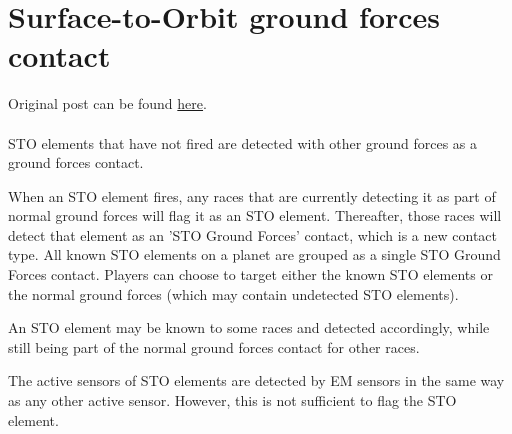 \documentclass[../../Aurora C# unofficial manual.tex]{subfiles}
\begin{document}
	\section{Surface-to-Orbit ground forces contact}
	Original post can be found
	\href{http://aurora2.pentarch.org/index.php?topic=8495.msg110505#msg110505}{here}.
	\\\\
	
	STO elements that have not fired are detected with other ground forces as a ground forces contact.
	
	When an STO element fires, any races that are currently detecting it as part of normal ground forces will flag it as an STO element. Thereafter, those races will detect that element as an 'STO Ground Forces' contact, which is a new contact type. All known STO elements on a planet are grouped as a single STO Ground Forces contact. Players can choose to target either the known STO elements or the normal ground forces (which may contain undetected STO elements).
	
	An STO element may be known to some races and detected accordingly, while still being part of the normal ground forces contact for other races.
	
	The active sensors of STO elements are detected by EM sensors in the same way as any other active sensor. However, this is not sufficient to flag the STO element.
\end{document}
